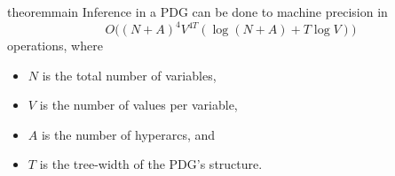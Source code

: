 \documentclass{article}
\begin{document}

\begin{linked}{theorem}{main}
    Inference in a PDG can be done to machine precision in
    \[ O\Big(  (N\!+\!A)^4 V^{4T} (\log (N\!+\!A) + T \log V ) \Big)
    \]
    operations, where     
    \begin{itemize}[nosep,
            ]
        \item $N$ is the total number of variables,
        \item $V$ is the number of values per variable,
        \item $A$ is the number of hyperarcs, and
        \item $T$ is the tree-width of the PDG's structure.
    \end{itemize}
    
\end{linked}


\end{document}
